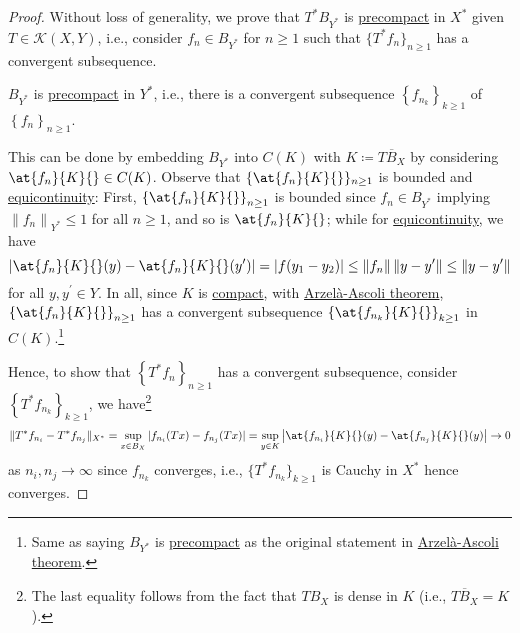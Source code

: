 \begin{proof}
	Without loss of generality, we prove that \(T^{\ast} B_{Y^{\ast} }\) is \hyperref[def:precompact]{precompact} in \(X^{\ast}\) given \(T\in \mathcal{K}(X, Y)\), i.e., consider \(f_n \in B_{Y^{\ast} }\) for \(n \geq 1\) such that \(\{T^{\ast} f_n\}_{n\geq 1}\) has a convergent subsequence.

	\begin{claim}
		\(B_{Y^{\ast} }\) is \hyperref[def:precompact]{precompact} in \(Y^{\ast} \), i.e., there is a convergent subsequence \(\left\{ f_{n_k} \right\} _{k\geq 1}\) of \(\left\{ f_n \right\} _{n\geq 1}\).
	\end{claim}
	\begin{explanation}
		This can be done by embedding \(B_{Y^{\ast} }\) into \(C(K)\) with \(K\coloneqq \overline{TB_X}\) by considering \(\at{f_n}{K}{} \in C(K)\). Observe that \(\{\at{f_n}{K}{}\}_{n\geq 1}\) is bounded and \hyperref[def:equicontinuous]{equicontinuity}: First, \(\left\{ \at{f_n}{K}{}  \right\} _{n\geq 1}\) is bounded since \(f_{n} \in B_{Y^{\ast} }\) implying \(\left\lVert f_n \right\rVert _{Y^{\ast} } \leq 1\) for all \(n\geq 1\), and so is \(\at{f_n}{K}{} \); while for \hyperref[def:equicontinuous]{equicontinuity}, we have
		\[
			\left\vert \at{f_{n}}{K}{} (y) - \at{f_{n}}{K}{} (y^\prime ) \right\vert
			= \vert f(y_1 - y_2) \vert
			\leq \left\lVert f_{n} \right\rVert \left\lVert y-y^\prime \right\rVert
			\leq \left\lVert y - y^\prime \right\rVert
		\]
		for all \(y, y^\prime \in Y\). In all, since \(K\) is \hyperref[def:compact]{compact}, with \hyperref[thm:Arzela-Ascoli]{Arzelà-Ascoli theorem}, \(\left\{ \at{f_n}{K}{} \right\}_{n\geq 1} \) has a convergent subsequence \(\left\{ \at{f_{n_k}}{K}{}\right\}_{k\geq 1} \) in \(C(K)\).\footnote{Same as saying \(B_{Y^{\ast} }\) is \hyperref[def:precompact]{precompact} as the original statement in \hyperref[thm:Arzela-Ascoli]{Arzelà-Ascoli theorem}.}
	\end{explanation}

	Hence, to show that \(\left\{ T^{\ast} f_n \right\}_{n\geq 1} \) has a convergent subsequence, consider \(\left\{ T^{\ast} f_{n_k} \right\}_{k\geq 1} \), we have\footnote{The last equality follows from the fact that \(TB_X\) is dense in \(K\) (i.e., \(\overline{TB_X} = K\)).}
	\[
		\lVert T^{\ast} f_{n_i} - T^{\ast} f_{n_j} \rVert_{X^{\ast} }
		= \sup _{x\in B_X} \vert f_{n_i}(Tx) - f_{n_j}(Tx)\vert
		= \sup _{y\in K} \left\vert \at{f_{n_i}}{K}{} (y) - \at{f_{n_j}}{K}{} (y) \right\vert \to 0
	\]
	as \(n_i, n_j \to \infty \) since \(f_{n_k}\) converges, i.e., \(\{T^{\ast} f_{n_{k} }\}_{k\geq 1}\) is Cauchy in \(X^{\ast} \) hence converges.
\end{proof}
